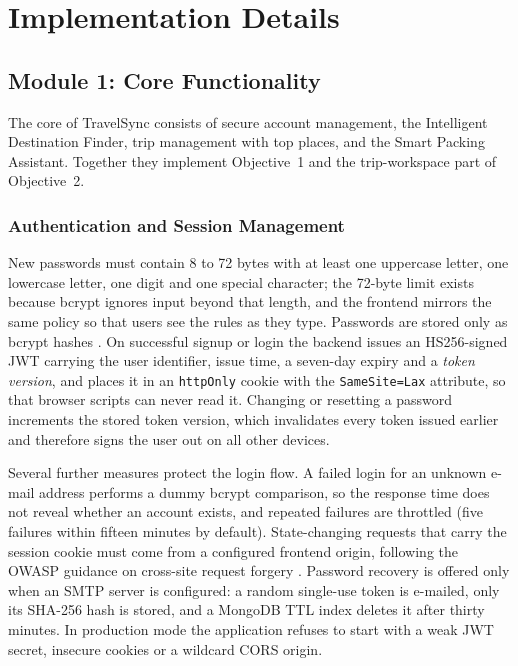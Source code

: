 \section{Implementation Details}
\label{sec:implementation}

\subsection{Module 1: Core Functionality}

The core of TravelSync consists of secure account management, the
Intelligent Destination Finder, trip management with top places, and the
Smart Packing Assistant. Together they implement Objective~1 and the
trip-workspace part of Objective~2.

\subsubsection{Authentication and Session Management}

New passwords must contain 8 to 72 bytes with at least one uppercase letter,
one lowercase letter, one digit and one special character; the 72-byte limit
exists because bcrypt ignores input beyond that length, and the frontend
mirrors the same policy so that users see the rules as they type. Passwords
are stored only as bcrypt hashes \cite{provos1999bcrypt}. On successful
signup or login the backend issues an HS256-signed JWT \cite{rfc7519}
carrying the user identifier, issue time, a seven-day expiry and a
\emph{token version}, and places it in an \texttt{httpOnly} cookie with the
\texttt{SameSite=Lax} attribute, so that browser scripts can never read it.
Changing or resetting a password increments the stored token version, which
invalidates every token issued earlier and therefore signs the user out on
all other devices.

Several further measures protect the login flow. A failed login for an
unknown e-mail address performs a dummy bcrypt comparison, so the response
time does not reveal whether an account exists, and repeated failures are
throttled (five failures within fifteen minutes by default). State-changing
requests that carry the session cookie must come from a configured frontend
origin, following the OWASP guidance on cross-site request forgery
\cite{owaspcsrf}. Password recovery is offered only when an SMTP server is
configured: a random single-use token is e-mailed, only its SHA-256 hash is
stored, and a MongoDB TTL index deletes it after thirty minutes. In
production mode the application refuses to start with a weak JWT secret,
insecure cookies or a wildcard CORS origin.

